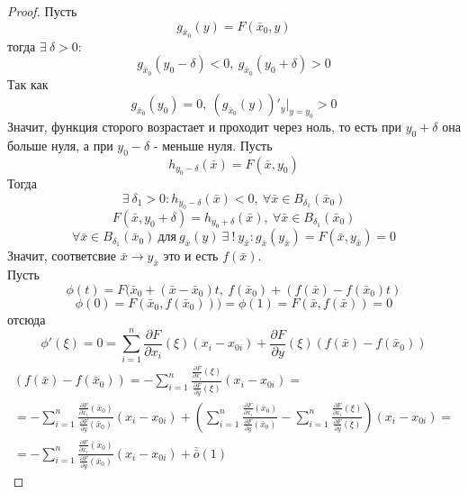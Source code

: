 \begin{proof}
    Пусть 
    \[g_{\bar{x}_0}(y)=F(\bar{x}_0,y)\] 
    тогда $\exists\ \delta>0$:
    \[g_{\bar{x}_0}(y_0-\delta)<0,\ g_{\bar{x}_0}(y_0+\delta)>0\]
    Так как 
    \[g_{\bar{x}_0}(y_0)=0,\ (g_{\bar{x}_0}(y))'_y|_{y=y_0}>0\]
    Значит, функция сторого возрастает и проходит через ноль, то есть при $y_0+\delta$ она больше нуля, а при $y_0-\delta$ - меньше нуля. Пусть
    \[h_{y_0-\delta}(\bar{x})=F(\bar{x},y_0)\] 
    Тогда 
    \[\exists\ \delta_1>0: h_{y_0-\delta}(\bar{x})<0,\ \forall \bar{x}\in B_{\delta_1}(\bar{x}_0)\]
    \[F(\bar{x}, y_0+\delta)=h_{y_0+\delta}(\bar{x}),\ \forall \bar{x}\in B_{\delta_1}(\bar{x}_0)\]
    \[\forall \bar{x}\in B_{\delta_1}(\bar{x}_0)\ \text{для}\ g_{\bar{x}}(y)\ \exists\ !\ y_{\bar{x}}: g_{\bar{x}}(y_{\bar{x}})=F(\bar{x},y_{\bar{x}})=0\]
    Значит, соответсвие $\bar{x}\to y_{\bar{x}}$ это и есть $f(\bar{x})$.\\
    Пусть 
    \[\phi(t)=F(\bar{x}_0+(\bar{x}-\bar{x}_0)t,\ f(\bar{x}_0)+(f(\bar{x})-f(\bar{x}_0)t)\]
    \[\phi(0)=F(\bar{x}_0, f(\bar{x}_0)))=\phi(1)=F(\bar{x}, f(\bar{x}))=0\]
    отсюда
    \[\phi'(\xi)=0=\sum\limits_{i=1}^{n}\frac{\partial {F}}{\partial {x_i}}(\xi)(x_i-x_{0i})+\frac{\partial {F}}{\partial {y}}(\xi)(f(\bar{x})-f(\bar{x}_0))\]
    \begin{multline*}
        (f(\bar{x})-f(\bar{x}_0))=-\sum\limits_{i=1}^{n}\frac{\frac{\partial {F}}{\partial {x_i}}(\xi)}{\frac{\partial {F}}{\partial {y}}(\xi)}(x_i-x_{0i})=\\
        =-\sum\limits_{i=1}^{n}\frac{\frac{\partial {F}}{\partial {x_i}}(\bar{x}_0)}{\frac{\partial {F}}{\partial {y}}(\bar{x}_0)}(x_i-x_{0i})+\left(\sum\limits_{i=1}^{n}\frac{\frac{\partial {F}}{\partial {x_i}}(\bar{x}_0)}{\frac{\partial {F}}{\partial {y}}(\bar{x}_0)}-\sum\limits_{i=1}^{n}\frac{\frac{\partial {F}}{\partial {x_i}}(\xi)}{\frac{\partial {F}}{\partial {y}}(\xi)}\right)(x_i-x_{0i})=\\
        =-\sum\limits_{i=1}^{n}\frac{\frac{\partial {F}}{\partial {x_i}}(\bar{x}_0)}{\frac{\partial {F}}{\partial {y}}(\bar{x}_0)}(x_i-x_{0i})+\bar{\bar{o}}{(1)}
    \end{multline*} 
\end{proof} 
